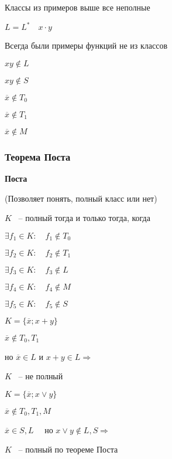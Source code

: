 \documentclass[russian]{lecture-notes}
\begin{document}
    \begin{remark}
        Классы из примеров выше все неполные
    \end{remark}

    \begin{example}
        $L = L^* \quad x \cdot y$

        Всегда были примеры функций не из классов

        $xy \notin L$

        $xy \notin S$

        $\overline{x} \notin T_0$

        $\overline{x} \notin T_1$

        $\overline{x} \notin M$
    \end{example}

    \subsubsection{Теорема Поста}

    \begin{theorem}
        \textbf{Поста}

        (Позволяет понять, полный класс или нет)

        $K$ ~-- полный тогда и только тогда, когда

        $\exists f_1 \in K: \quad f_1 \notin T_0$

        $\exists f_2 \in K: \quad f_2 \notin T_1$

        $\exists f_3 \in K: \quad f_3 \notin L$

        $\exists f_4 \in K: \quad f_4 \notin M$

        $\exists f_5 \in K: \quad f_5 \notin S$
    \end{theorem}

    \begin{example}
        $K = \{ \overline{x}; x + y \}$

        $\overline{x} \notin T_0, T_1$

        но $\overline{x} \in L$ и $x + y \in L \Rightarrow$

        $K$ ~-- не полный
    \end{example}

    \begin{example}
        $K = \{ \overline{x}; x \lor y \}$

        $\overline{x} \notin T_0, T_1, M$

        $\overline{x} \in S, L \quad $ но $x \lor y \notin L, S \Rightarrow$

        $K$ ~-- полный по теореме Поста
    \end{example}
\end{document}

